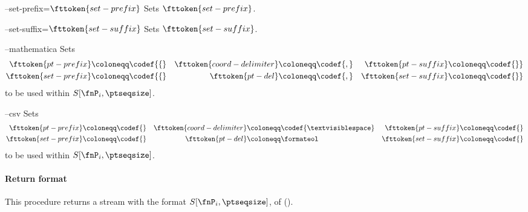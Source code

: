 \begin{procarg}{--set-prefix=$\fttoken{set-prefix}$}
  Sets $\fttoken{set-prefix}$.
\end{procarg}

\begin{procarg}{--set-suffix=$\fttoken{set-suffix}$}
  Sets $\fttoken{set-suffix}$.
\end{procarg}

\begin{procarg}{--mathematica}
  Sets 
  \begin{align*}
    \fttoken{pt-prefix} &\coloneqq \codef{\{} &
    \fttoken{coord-delimiter} &\coloneqq \codef{,} &
    \fttoken{pt-suffix} &\coloneqq \codef{\}} \\
    \fttoken{set-prefix} &\coloneqq \codef{\{} &
    \fttoken{pt-del} &\coloneqq \codef{,} &
    \fttoken{set-suffix} &\coloneqq \codef{\}}
  \end{align*}
  to be used within $S[\fnP_i, \ptseqsize]$.
\end{procarg}

\begin{procarg}{--csv}
  Sets 
  \begin{align*}
    \fttoken{pt-prefix} &\coloneqq \codef{} &
    \fttoken{coord-delimiter} &\coloneqq \codef{\textvisiblespace } &
    \fttoken{pt-suffix} &\coloneqq \codef{} \\
    \fttoken{set-prefix} &\coloneqq \codef{} &
    \fttoken{pt-del} &\coloneqq \formateol &
    \fttoken{set-suffix} &\coloneqq \codef{}
  \end{align*}
  to be used within $S[\fnP_i, \ptseqsize]$.
\end{procarg}

\procargsilent

\paragraph{Return format}

This procedure returns a stream with the format $S[\fnP_i, \ptseqsize]$, of ().
